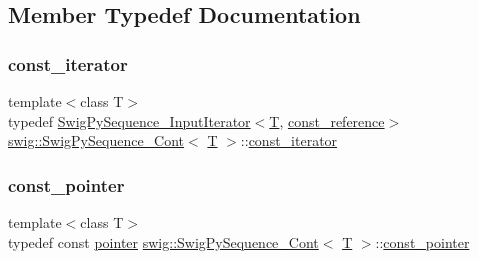 \subsection{Member Typedef Documentation}
\mbox{\label{structswig_1_1_swig_py_sequence___cont_a708a6b3790b68aa53bd79d27a2c16b89}} 
\subsubsection{\texorpdfstring{const\+\_\+iterator}{const\_iterator}}
{\footnotesize\ttfamily template$<$class T$>$ \\
typedef \hyperlink{structswig_1_1_swig_py_sequence___input_iterator}{Swig\+Py\+Sequence\+\_\+\+Input\+Iterator}$<$\hyperlink{fmt_8h_a0acb682b8260ab1c60b918599864e2e5}{T}, \hyperlink{structswig_1_1_swig_py_sequence___cont_a9c8d1d3acc0234f3a9cbd570ee7e9cf0}{const\+\_\+reference}$>$ \hyperlink{structswig_1_1_swig_py_sequence___cont}{swig\+::\+Swig\+Py\+Sequence\+\_\+\+Cont}$<$ \hyperlink{fmt_8h_a0acb682b8260ab1c60b918599864e2e5}{T} $>$\+::\hyperlink{structswig_1_1_swig_py_sequence___cont_a708a6b3790b68aa53bd79d27a2c16b89}{const\+\_\+iterator}}

\mbox{\label{structswig_1_1_swig_py_sequence___cont_ab4ac20f379a9c7793597569834eb3cf9}} 
\subsubsection{\texorpdfstring{const\+\_\+pointer}{const\_pointer}}
{\footnotesize\ttfamily template$<$class T$>$ \\
typedef const \hyperlink{structswig_1_1_swig_py_sequence___cont_a168a126e49131e25b2616d411f71fb9a}{pointer} \hyperlink{structswig_1_1_swig_py_sequence___cont}{swig\+::\+Swig\+Py\+Sequence\+\_\+\+Cont}$<$ \hyperlink{fmt_8h_a0acb682b8260ab1c60b918599864e2e5}{T} $>$\+::\hyperlink{structswig_1_1_swig_py_sequence___cont_ab4ac20f379a9c7793597569834eb3cf9}{const\+\_\+pointer}}

